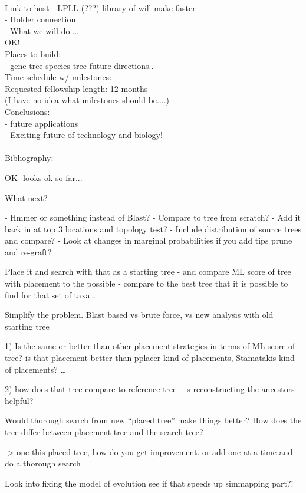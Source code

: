 \\Link to   host -  LPLL (???) library of will make faster
\\       - Holder connection
\\     - What we will do....
\\         OK!
\\     Places to build:
\\         - gene tree species tree future directions..
\\Time schedule w/ milestones:
\\   Requested fellowship length: 12 months
\\   (I have no idea what milestones should be....)
\\Conclusions:
\\   - future applications
\\   - Exciting future of technology and biology!
\\  
\\Bibliography:



OK- looks ok so far...

What next?

- Hmmer or something instead of Blast?
- Compare to tree from scratch?
- Add it back in at top 3 locations and topology test?
- Include distribution of source trees and compare?
- Look at changes in marginal probabilities if you add tips prune and re-graft?

Place it and search with that as a starting tree - 
and compare ML score of tree with placement to the possible - compare to the best tree that it is possible to find for that set of taxa…

Simplify the problem.
Blast based vs brute force, vs new analysis with old starting tree

1) Is the same or better than other placement strategies in terms of ML score of tree?
is that placement better than pplacer kind of placements, Stamatakis kind of placements? … 

2) how does that tree compare to reference tree
- is reconstructing the ancestors helpful?

Would thorough search from new “placed tree” make things better?
How does the tree differ between placement tree and the search tree?


-> one this placed tree, how do you get improvement.
or add one at a time and do a thorough search 

Look into fixing the model of evolution see if that speeds up simmapping part?!


